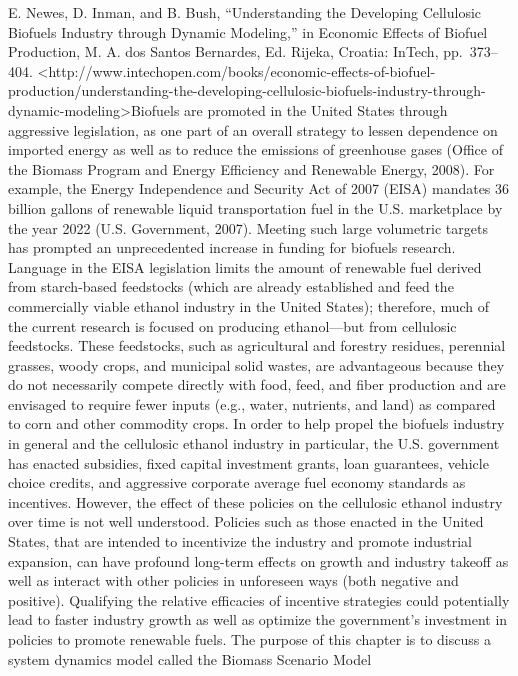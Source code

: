 \documentclass[]{article}
\begin{document}
E. Newes, D. Inman, and B. Bush, ``Understanding the Developing
Cellulosic Biofuels Industry through Dynamic Modeling,'' in Economic
Effects of Biofuel Production, M. A. dos Santos Bernardes, Ed. Rijeka,
Croatia: InTech, pp.~373--404.
\textless{}http://www.intechopen.com/books/economic-effects-of-biofuel-production/understanding-the-developing-cellulosic-biofuels-industry-through-dynamic-modeling\textgreater{}Biofuels
are promoted in the United States through aggressive legislation, as one
part of an overall strategy to lessen dependence on imported energy as
well as to reduce the emissions of greenhouse gases (Office of the
Biomass Program and Energy Efficiency and Renewable Energy, 2008). For
example, the Energy Independence and Security Act of 2007 (EISA)
mandates 36 billion gallons of renewable liquid transportation fuel in
the U.S. marketplace by the year 2022 (U.S. Government, 2007). Meeting
such large volumetric targets has prompted an unprecedented increase in
funding for biofuels research. Language in the EISA legislation limits
the amount of renewable fuel derived from starch-based feedstocks (which
are already established and feed the commercially viable ethanol
industry in the United States); therefore, much of the current research
is focused on producing ethanol---but from cellulosic feedstocks. These
feedstocks, such as agricultural and forestry residues, perennial
grasses, woody crops, and municipal solid wastes, are advantageous
because they do not necessarily compete directly with food, feed, and
fiber production and are envisaged to require fewer inputs (e.g., water,
nutrients, and land) as compared to corn and other commodity crops. In
order to help propel the biofuels industry in general and the cellulosic
ethanol industry in particular, the U.S. government has enacted
subsidies, fixed capital investment grants, loan guarantees, vehicle
choice credits, and aggressive corporate average fuel economy standards
as incentives. However, the effect of these policies on the cellulosic
ethanol industry over time is not well understood. Policies such as
those enacted in the United States, that are intended to incentivize the
industry and promote industrial expansion, can have profound long-term
effects on growth and industry takeoff as well as interact with other
policies in unforeseen ways (both negative and positive). Qualifying the
relative efficacies of incentive strategies could potentially lead to
faster industry growth as well as optimize the government's investment
in policies to promote renewable fuels. The purpose of this chapter is
to discuss a system dynamics model called the Biomass Scenario Model
\end{document}
